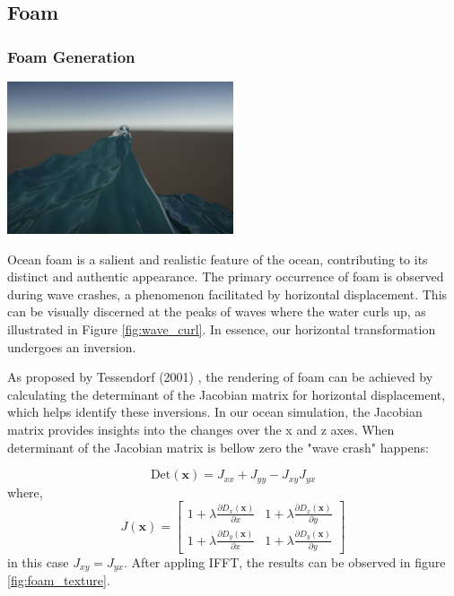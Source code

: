 \subsection{Foam}
\subsubsection{Foam Generation}
\begin{minipage}{1\textwidth}
    \centering
    \includegraphics[width=0.50\textwidth]{"images/wave_curl.png"}
    \label{fig:wave_curl}
\end{minipage}

Ocean foam is a salient and realistic feature of the ocean, contributing to its distinct and authentic appearance. The primary occurrence of foam is observed during wave crashes, a phenomenon facilitated by horizontal displacement. This can be visually discerned at the peaks of waves where the water curls up, as illustrated in Figure \ref{fig:wave_curl}. In essence, our horizontal transformation undergoes an inversion.

As proposed by Tessendorf (2001) \cite{tessendorf2001}, the rendering of foam can be achieved by calculating the determinant of the Jacobian matrix for horizontal displacement, which helps identify these inversions. In our ocean simulation, the Jacobian matrix provides insights into the changes over the x and z axes. When determinant of the Jacobian matrix is bellow zero the "wave crash" happens:

\begin{equation}
    \text{Det}(\mathbf{x}) = J_{xx} + J_{yy} - J_{xy} J_{yx}
\end{equation}
where,
\begin{equation}
    J(\mathbf{x}) = 
    \begin{bmatrix} 
        1 + \lambda\frac{\partial D_x(\mathbf{x})}{\partial x} & 1 + \lambda\frac{\partial D_x(\mathbf{x})}{\partial y} \\
        1 + \lambda\frac{\partial D_y(\mathbf{x})}{\partial x} & 1 + \lambda\frac{\partial D_y(\mathbf{x})}{\partial y} 
    \end{bmatrix} 
\end{equation}
in this case $J_{xy} = J_{yx}$. After appling IFFT, the results can be observed in figure \ref{fig:foam_texture}.

